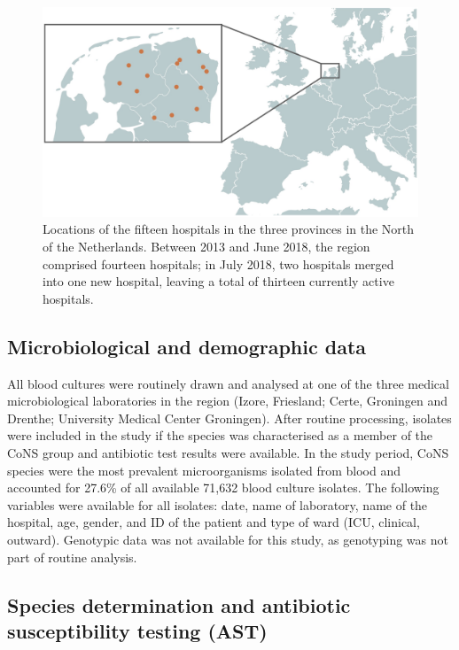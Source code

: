 \documentclass[
]{book}
\begin{document}
\begin{figure}

{\centering \includegraphics[width=1\linewidth]{images/07-01} 

}

\caption{Locations of the fifteen hospitals in the three provinces in the North of the Netherlands. Between 2013 and June 2018, the region comprised fourteen hospitals; in July 2018, two hospitals merged into one new hospital, leaving a total of thirteen currently active hospitals.}\label{fig:fig7-1}
\end{figure}

\hypertarget{microbiological-and-demographic-data}{%
\subsection{Microbiological and demographic data}\label{microbiological-and-demographic-data}}

All blood cultures were routinely drawn and analysed at one of the three medical microbiological laboratories in the region (Izore, Friesland; Certe, Groningen and Drenthe; University Medical Center Groningen). After routine processing, isolates were included in the study if the species was characterised as a member of the CoNS group and antibiotic test results were available. In the study period, CoNS species were the most prevalent microorganisms isolated from blood and accounted for 27.6\% of all available 71,632 blood culture isolates. The following variables were available for all isolates: date, name of laboratory, name of the hospital, age, gender, and ID of the patient and type of ward (ICU, clinical, outward). Genotypic data was not available for this study, as genotyping was not part of routine analysis.

\hypertarget{species-determination-and-antibiotic-susceptibility-testing-ast}{%
\subsection{Species determination and antibiotic susceptibility testing (AST)}\label{species-determination-and-antibiotic-susceptibility-testing-ast}}
\end{document}
